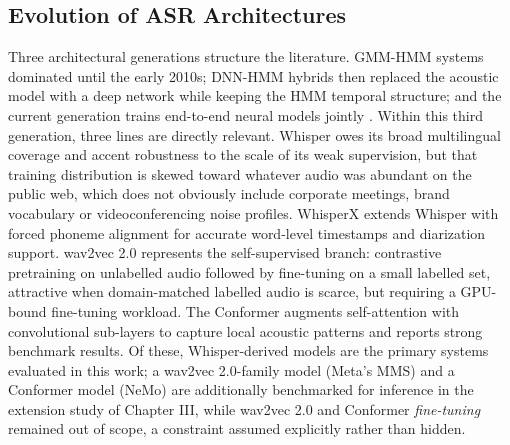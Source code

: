\documentclass[12pt]{report}
\begin{document}
\subsection{Evolution of ASR Architectures}
Three architectural generations structure the literature. GMM-HMM systems dominated until the early 2010s; DNN-HMM hybrids then replaced the acoustic model with a deep network while keeping the HMM temporal structure; and the current generation trains end-to-end neural models jointly \cite{li2014overview,vaswani2017attention}. Within this third generation, three lines are directly relevant. Whisper \cite{radford2023robust} owes its broad multilingual coverage and accent robustness to the scale of its weak supervision, but that training distribution is skewed toward whatever audio was abundant on the public web, which does not obviously include corporate meetings, brand vocabulary or videoconferencing noise profiles. WhisperX \cite{bain2023whisperx} extends Whisper with forced phoneme alignment for accurate word-level timestamps and diarization support. wav2vec 2.0 \cite{baevski2020wav2vec} represents the self-supervised branch: contrastive pretraining on unlabelled audio followed by fine-tuning on a small labelled set, attractive when domain-matched labelled audio is scarce, but requiring a GPU-bound fine-tuning workload. The Conformer \cite{gulati2020conformer} augments self-attention with convolutional sub-layers to capture local acoustic patterns and reports strong benchmark results. Of these, Whisper-derived models are the primary systems evaluated in this work; a wav2vec 2.0-family model (Meta's MMS) and a Conformer model (NeMo) are additionally benchmarked for inference in the extension study of Chapter III, while wav2vec 2.0 and Conformer \emph{fine-tuning} remained out of scope, a constraint assumed explicitly rather than hidden.
\end{document}
